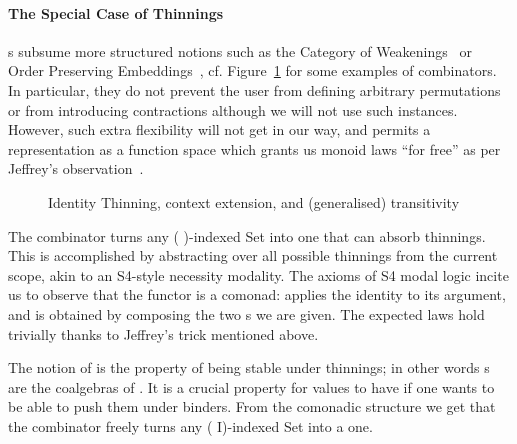 \paragraph{The Special Case of Thinnings} s subsume more
structured notions such as the Category of
Weakenings~\cite{altenkirch1995categorical} or Order Preserving
Embeddings~\cite{chapman2009type}, cf. Figure~\ref{fig:thincomb} for
some examples of combinators. In particular, they do not prevent the
user from defining arbitrary permutations or from introducing contractions
although we will not use such instances. However, such extra flexibility
will not get in our way, and permits a representation as a function space
which grants us monoid laws ``for free'' as per Jeffrey's
observation~\citeyear{jeffrey2011assoc}.

\begin{figure}[h]
\begin{minipage}{0.45\textwidth}
\end{minipage}
\begin{minipage}{0.45\textwidth}
\end{minipage}
\caption{Identity Thinning, context extension, and (generalised) transitivity}\label{fig:thincomb}
\end{figure}


The  combinator turns any ( )-indexed Set into one that can
absorb thinnings. This is accomplished by abstracting over all possible thinnings
from the current scope, akin to an S4-style necessity modality. The axioms of S4
modal logic incite us to observe that the functor  is a comonad: 
applies the identity  to its argument, and  is obtained
by composing the two s we are given. The expected laws hold trivially
thanks to Jeffrey's trick mentioned above.

The notion of  is the property of being stable under thinnings;
in other words s are the coalgebras of .
It is a crucial property for values to have if one wants to be able to push
them under binders. From the comonadic structure we get that
the  combinator freely turns any ( I)-indexed Set into a
 one.

